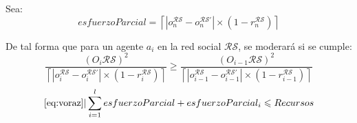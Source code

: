 \documentclass[letterpaper,10pt]{article}
\begin{document}
Sea:
\[
  esfuerzoParcial = \left\lceil  |o_n^{\mathcal{R}\mathcal{S}} - o_n^{\mathcal{R}\mathcal{S}'}| \times (1 - r_n^{\mathcal{R}\mathcal{S}}) \right\rceil
\]

De tal forma que para un agente $a_i$ en la red social $\mathcal{R}\mathcal{S}$, se moderará si se cumple:
\begin{equation}
  \frac{(O_i\mathcal{R} \mathcal{S})^2}{\left\lceil  |o_i^{\mathcal{R}\mathcal{S}} - o_i^{\mathcal{R}\mathcal{S}'}| \times (1 - r_i^{\mathcal{R}\mathcal{S}}) \right\rceil} \geqslant  \frac{(O_{i-1} \mathcal{R} \mathcal{S})^2}{\left\lceil  |o_{i-1}^{\mathcal{R}\mathcal{S}} - o_{i-1}^{\mathcal{R}\mathcal{S}'}| \times (1 - r_{i-1}^{\mathcal{R}\mathcal{S}}) \right\rceil}
  \label{eq:voraz}
\end{equation}
\begin{equation}
  \eqref{eq:voraz} | \sum_{i=1}^{l}esfuerzoParcial + esfuerzoParcial_i \leqslant Recursos
  \label{eq:voraz2}
\end{equation}
\end{document}
